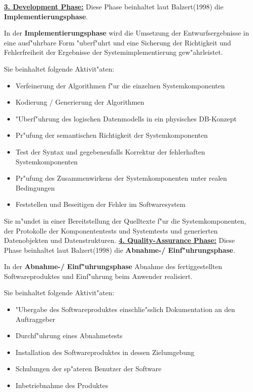 \bigbreak
\underline{\textbf{3. Development Phase:}}
\smallbreak
Diese Phase beinhaltet laut Balzert(1998)\supercite{Balzert1998} die \textbf{Implementierungsphase}.

In der \textbf{Implementierungsphase} wird die Umsetzung der Entwurfsergebnisse in eine ausf"uhrbare Form "uberf"uhrt und eine Sicherung der Richtigkeit und Fehlerfreiheit der Ergebnisse der Systemimplementierung gew"ahrleistet.

Sie beinhaltet folgende Aktivit"aten:
\begin{itemize}
  \item Verfeinerung der Algorithmen f"ur die einzelnen Systemkomponenten
  \item Kodierung / Generierung der Algorithmen
  \item "Uberf"uhrung des logischen Datenmodells in ein physisches DB-Konzept
  \item Pr"ufung der semantischen Richtigkeit der Systemkomponenten
  \item Test der Syntax und gegebenenfalls Korrektur der fehlerhaften Systemkomponenten
  \item Pr"ufung des Zusammenwirkens der Systemkomponenten unter realen Bedingungen
  \item Feststellen und Beseitigen der Fehler im Softwaresystem
\end{itemize}
Sie m"undet in einer Bereitstellung der Quelltexte f"ur die Systemkomponenten, der Protokolle der Komponententests und Systemtests und generierten Datenobjekten und Datenstrukturen.
\bigbreak
\underline{\textbf{4. Quality-Assurance Phase:}}
\smallbreak
Diese Phase beinhaltet laut Balzert(1998)\supercite{Balzert1998} die \textbf{Abnahme-/ Einf"uhrungsphase}.

In der \textbf{Abnahme-/ Einf"uhrungsphase} Abnahme des fertiggestellten Softwareproduktes und Einf"uhrung beim Anwender realisiert.

Sie beinhaltet folgende Aktivit"aten:

\begin{itemize}
  \item "Ubergabe des Softwareproduktes einschlie"sslich Dokumentation an den Auftraggeber
  \item Durchf"uhrung eines Abnahmetests
  \item Installation des Softwareproduktes in dessen Zielumgebung
  \item Schulungen der sp"ateren Benutzer der Software
  \item Inbetriebnahme des Produktes
\end{itemize}

